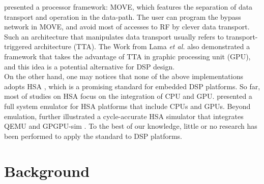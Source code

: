 \documentclass[12pt]{article}
\begin{document}
\begin{CJK}{UTF8}{bkai}
    \cite{move} presented a processor framework: MOVE, which features the separation of data transport and operation in the data-path. 
    The user can program the bypass network in MOVE, and avoid most of accesses to RF by clever data transport.
    Such an architecture that manipulates data transport usually refers to transport-triggered architecture (TTA).
    The Work from Lama \textit{et al.} \cite{ttagpu} also demonstrated a framework that takes the advantage of TTA in graphic processing unit (GPU), and this idea is a potential alternative for DSP design.
    \\
    On the other hand, one may notices that none of the above implementations adopts HSA \cite{systemspec}, which is a promising standard for embedded DSP platforms.
    So far, most of studies on HSA focus on the integration of CPU and GPU. \cite{hsaemu} presented a full system emulator for HSA platforms that include CPUs and GPUs.
    Beyond emulation, \cite{hsacyc} further illustrated a cycle-accurate HSA simulator that integrates QEMU and GPGPU-sim \cite{gpgpusim}.
    To the best of our knowledge, little or no research has been performed to apply the standard to DSP platforms.

\newpage

\section{Background}


\end{CJK}
\end{document}

